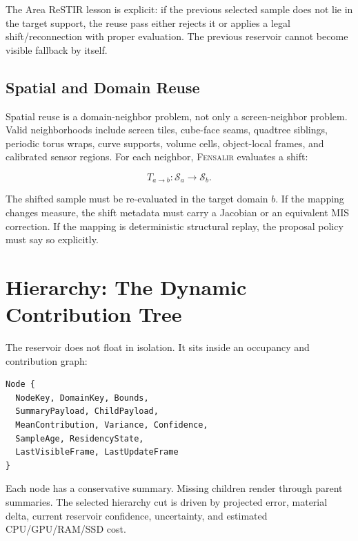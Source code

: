 \documentclass[11pt]{article}
\newcommand{\Fensalir}{\textsc{Fensalir}}
\newcommand{\AreaReSTIR}{Area ReSTIR}
\newcommand{\Sample}{\mathcal{S}}
\begin{document}
The \AreaReSTIR{} lesson is explicit: if the previous selected sample does not
lie in the target support, the reuse pass either rejects it or applies a legal
shift/reconnection with proper evaluation.  The previous reservoir cannot
become visible fallback by itself.

\subsection{Spatial and Domain Reuse}

Spatial reuse is a domain-neighbor problem, not only a screen-neighbor problem.
Valid neighborhoods include screen tiles, cube-face seams, quadtree siblings,
periodic torus wraps, curve supports, volume cells, object-local frames, and
calibrated sensor regions.  For each neighbor, \Fensalir{} evaluates a shift:

\begin{equation}
  T_{a\rightarrow b}: \Sample_a \rightarrow \Sample_b.
\end{equation}

The shifted sample must be re-evaluated in the target domain \(b\).  If the
mapping changes measure, the shift metadata must carry a Jacobian or an
equivalent MIS correction.  If the mapping is deterministic structural replay,
the proposal policy must say so explicitly.

\section{Hierarchy: The Dynamic Contribution Tree}

The reservoir does not float in isolation.  It sits inside an occupancy and
contribution graph:

\begin{center}
\begin{minipage}{0.86\linewidth}
\small
\begin{verbatim}
Node {
  NodeKey, DomainKey, Bounds,
  SummaryPayload, ChildPayload,
  MeanContribution, Variance, Confidence,
  SampleAge, ResidencyState,
  LastVisibleFrame, LastUpdateFrame
}
\end{verbatim}
\end{minipage}
\end{center}

Each node has a conservative summary.  Missing children render through parent
summaries.  The selected hierarchy cut is driven by projected error, material
delta, current reservoir confidence, uncertainty, and estimated CPU/GPU/RAM/SSD
cost.
\end{document}
